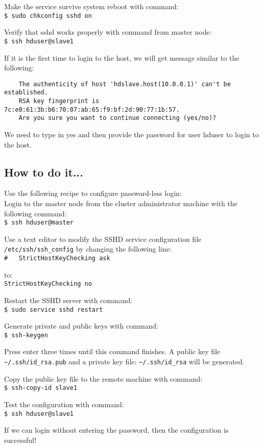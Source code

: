 Make the service survive system reboot with command: \\
\verb|$ sudo chkconfig sshd on|

Verify that sshd works properly with command from master node: \\
\verb|$ ssh hduser@slave1|

If it is the first time to login to the host, we will get message similar to the following:
\begin{verbatim}
    The authenticity of host 'hdslave.host(10.0.0.1)' can't be established.
    RSA key fingerprint is 7c:e0:61:3b:b6:70:07:ab:65:f9:bf:2d:90:77:1b:57.
    Are you sure you want to continue connecting (yes/no)?
\end{verbatim}

We need to type in yes and then provide the password for user hduser to login to the host.
\subsection*{How to do it...}
Use the following recipe to configure password-less login: \\
Login to the master node from the cluster administrator machine with the following command: \\
\verb|$ ssh hduser@master|
    
Use a text editor to modify the SSHD service configuration file \verb|/etc/ssh/ssh_config| by changing the following line: \\
\verb|#   StrictHostKeyChecking ask|

to: \\
\verb|StrictHostKeyChecking no|
    
Restart the SSHD server with command: \\
\verb|$ sudo service sshd restart|

Generate private and public keys with command: \\
\verb|$ ssh-keygen|

Press enter three times until this command finishes. A public key file \verb|~/.ssh/id_rsa.pub| and a private key file: \verb|~/.ssh/id_rsa| will be generated.

Copy the public key file to the remote machine with command: \\
\verb|$ ssh-copy-id slave1|
    
Test the configuration with command: \\
\verb|$ ssh hduser@slave1|

If we can login without entering the password, then the configuration is successful!

